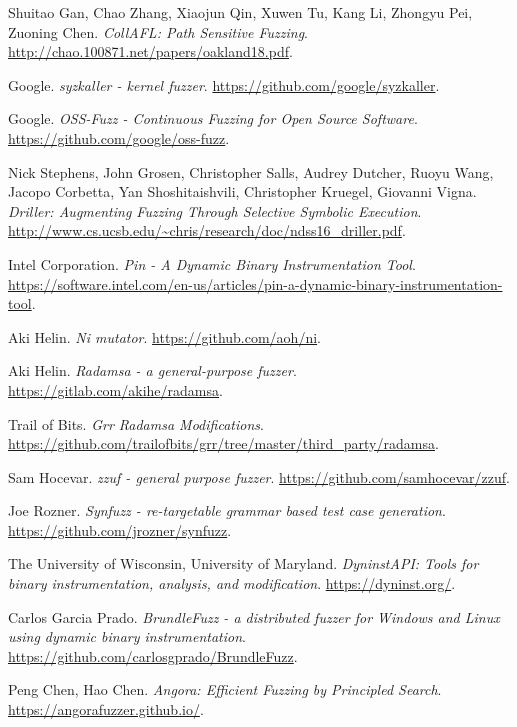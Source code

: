 \begin{thebibliography}{99}
  Shuitao Gan, Chao Zhang, Xiaojun Qin, Xuwen Tu, Kang Li, Zhongyu Pei, Zuoning Chen.
  \textit{CollAFL: Path Sensitive Fuzzing}.
  \url{http://chao.100871.net/papers/oakland18.pdf}.

  Google.
  \textit{syzkaller - kernel fuzzer}.
  \url{https://github.com/google/syzkaller}.

  Google.
  \textit{OSS-Fuzz - Continuous Fuzzing for Open Source Software}.
  \url{https://github.com/google/oss-fuzz}.

  Nick Stephens, John Grosen, Christopher Salls, Audrey Dutcher, Ruoyu Wang,
  Jacopo Corbetta, Yan Shoshitaishvili, Christopher Kruegel, Giovanni Vigna.
  \textit{Driller: Augmenting Fuzzing Through Selective Symbolic Execution}.
  \url{http://www.cs.ucsb.edu/~chris/research/doc/ndss16_driller.pdf}.

  Intel Corporation.
  \textit{Pin - A Dynamic Binary Instrumentation Tool}.
  \url{https://software.intel.com/en-us/articles/pin-a-dynamic-binary-instrumentation-tool}.

  Aki Helin.
  \textit{Ni mutator}.
  \url{https://github.com/aoh/ni}.

  Aki Helin.
  \textit{Radamsa - a general-purpose fuzzer}.
  \url{https://gitlab.com/akihe/radamsa}.

  Trail of Bits.
  \textit{Grr Radamsa Modifications}.
  \url{https://github.com/trailofbits/grr/tree/master/third_party/radamsa}.

  Sam Hocevar.
  \textit{zzuf - general purpose fuzzer}.
  \url{https://github.com/samhocevar/zzuf}.

  Joe Rozner.
  \textit{Synfuzz - re-targetable grammar based test case generation}.
  \url{https://github.com/jrozner/synfuzz}.

  The University of Wisconsin, University of Maryland.
  \textit{DyninstAPI: Tools for binary instrumentation, analysis, and modification}.
  \url{https://dyninst.org/}.

  Carlos Garcia Prado.
  \textit{BrundleFuzz - a distributed fuzzer for Windows and Linux using dynamic binary instrumentation}.
  \url{https://github.com/carlosgprado/BrundleFuzz}.

  Peng Chen, Hao Chen.
  \textit{Angora: Efficient Fuzzing by Principled Search}.
  \url{https://angorafuzzer.github.io/}.


\end{thebibliography}

